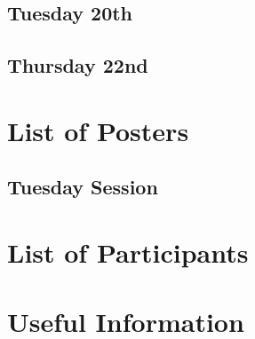 \documentclass[openany, parskip=full, 12pt, a4]{scrbook}
\begin{document}
\section{Tuesday 20th}










\section{Thursday 22nd}



\chapter{List of Posters} 

\vspace{-2.5em}

\section{Tuesday Session}











\chapter{List of Participants}
 

 
\chapter{Useful Information}
\end{document}
